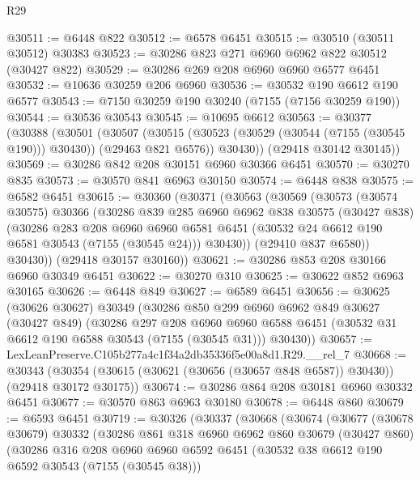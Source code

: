 \begin{lexlean}{R29}
\begin{coremodule}
@30511 := @6448 @822
@30512 := @6578 @6451
@30515 := @30510 (@30511 @30512) @30383
@30523 := @30286 @823 @271 @6960 @6962 @822 @30512 (@30427 @822)
@30529 := @30286 @269 @208 @6960 @6960 @6577 @6451
@30532 := @10636 @30259 @206 @6960
@30536 := @30532 @190 @6612 @190 @6577
@30543 := @7150 @30259 @190 @30240 (@7155 (@7156 @30259 @190))
@30544 := @30536 @30543
@30545 := @10695 @6612
@30563 := @30377
    (@30388
      (@30501
        (@30507
          (@30515 (@30523 (@30529 (@30544 (@7155 (@30545 @190))) @30430)) (@29463 @821 @6576))
          @30430))
      (@29418 @30142 @30145))
@30569 := @30286 @842 @208 @30151 @6960 @30366 @6451
@30570 := @30270 @835
@30573 := @30570 @841 @6963 @30150
@30574 := @6448 @838
@30575 := @6582 @6451
@30615 := @30360
    (@30371
      (@30563
        (@30569
          (@30573
            (@30574 @30575)
            @30366
            (@30286
              @839
              @285
              @6960
              @6962
              @838
              @30575
              (@30427 @838)
              (@30286
                @283
                @208
                @6960
                @6960
                @6581
                @6451
                (@30532 @24 @6612 @190 @6581 @30543 (@7155 (@30545 @24)))
                @30430))
            (@29410 @837 @6580))
          @30430))
      (@29418 @30157 @30160))
@30621 := @30286 @853 @208 @30166 @6960 @30349 @6451
@30622 := @30270 @310
@30625 := @30622 @852 @6963 @30165
@30626 := @6448 @849
@30627 := @6589 @6451
@30656 := @30625
    (@30626 @30627)
    @30349
    (@30286
      @850
      @299
      @6960
      @6962
      @849
      @30627
      (@30427 @849)
      (@30286
        @297
        @208
        @6960
        @6960
        @6588
        @6451
        (@30532 @31 @6612 @190 @6588 @30543 (@7155 (@30545 @31)))
        @30430))
@30657 := LexLeanPreserve.C105b277a4c1f34a2db35336f5e00a8d1.R29.__rel_7
@30668 := @30343
    (@30354 (@30615 (@30621 (@30656 (@30657 @848 @6587)) @30430)) (@29418 @30172 @30175))
@30674 := @30286 @864 @208 @30181 @6960 @30332 @6451
@30677 := @30570 @863 @6963 @30180
@30678 := @6448 @860
@30679 := @6593 @6451
@30719 := @30326
    (@30337
      (@30668
        (@30674
          (@30677
            (@30678 @30679)
            @30332
            (@30286
              @861
              @318
              @6960
              @6962
              @860
              @30679
              (@30427 @860)
              (@30286
                @316
                @208
                @6960
                @6960
                @6592
                @6451
                (@30532 @38 @6612 @190 @6592 @30543 (@7155 (@30545 @38)))

\end{coremodule}
\end{lexlean}
